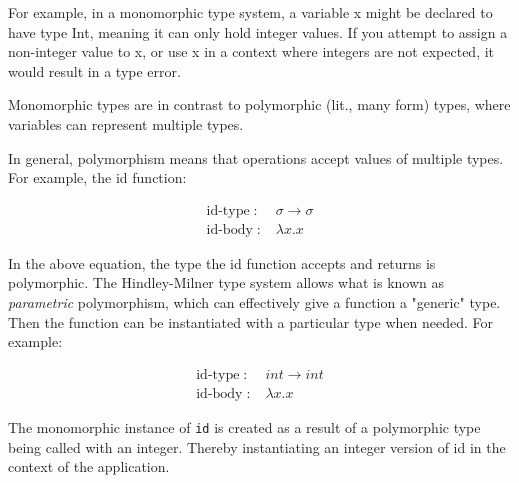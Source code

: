 \documentclass{l4proj}
\begin{document}
For example, in a monomorphic type system, a variable x might be declared to have type Int, meaning it can only hold integer values.
If you attempt to assign a non-integer value to x, or use x in a context where integers are not expected, it would result in a type error.

Monomorphic types are in contrast to polymorphic (lit., many form) types, where variables can represent multiple types.







In general, polymorphism means that operations accept values of multiple types. For example, the id function:

\begin{align*} 
   \text{id-type} \; :& \; \sigma \rightarrow \sigma\\
   \text{id-body} \; :& \; \lambda x . x
\end{align*}

In the above equation, the type the id function accepts and returns is polymorphic.
The Hindley-Milner type system allows what is known as \emph{parametric} polymorphism, which can effectively give a function a "generic" type.
Then the function can be instantiated with a particular type when needed. 
For example:

\begin{align*}\label{eq:lambda-id-instantiated} 
    \text{id-type} \; :& \; int \rightarrow int \\
    \text{id-body} \; :& \; \lambda x . x
\end{align*}

The monomorphic instance of \texttt{id} is created as a result of a polymorphic type being called with an integer.
Thereby instantiating an integer version of id in the context of the application.


\end{document}
